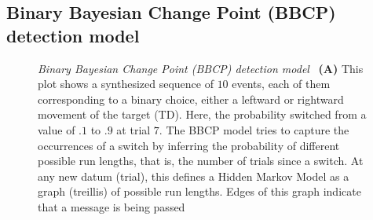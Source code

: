 \documentclass[12pt,english]{article}%
\newcommand{\seeFig}[1]{Figure~\ref{fig:#1}}
\begin{document}
\subsection{Binary Bayesian Change Point (BBCP) detection model}
\begin{figure}%
\caption{\emph{Binary Bayesian Change Point (BBCP) detection model}
~\textbf{(A)} This plot shows a synthesized sequence of $10$ events,
each of them corresponding to a binary choice,
either a leftward or rightward movement of the target (TD).
Here, the probability switched from a value of $.1$ to $.9$ at trial $7$.
The BBCP model tries to capture the occurrences of a switch
by inferring the probability of different possible run lengths,
that is, the number of trials since a switch.
At any new datum (trial), this defines a Hidden Markov Model
as a graph (treillis) of possible run lengths.
Edges of this graph indicate that a message is being passed
}
\end{figure}
\end{document}
